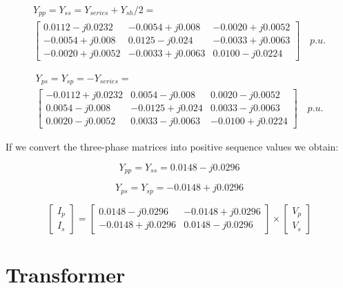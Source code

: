 \documentclass[nols,a4paper,twoside,notoc,fleqn]{tufte-book}
\begin{document}
\begin{equation}
	\begin{split}
		Y_{pp} = Y_{ss} = Y_{series} + Y_{sh}/2 = \\
		 \left[ \begin{array}{ccc}
		0.0112-j0.0232  & -0.0054+j0.008   & -0.0020+j0.0052 \\ -0.0054+j0.008  &  0.0125-j0.024 & -0.0033+j0.0063 \\ -0.0020+j0.0052 &  -0.0033+j0.0063 & 0.0100-j0.0224
		\end{array} \right]\quad  p.u.
	\end{split}
\end{equation}

\begin{equation}
	\begin{split}
		Y_{ps} = Y_{sp} = -Y_{series} = \\ \left[ \begin{array}{ccc}
		-0.0112+j0.0232  & 0.0054-j0.008   & 0.0020-j0.0052 \\  0.0054-j0.008  &  -0.0125+j0.024 & 0.0033-j0.0063 \\  0.0020-j0.0052 &  0.0033-j0.0063 & -0.0100+j0.0224
		\end{array} \right]\quad  p.u.
	\end{split}
\end{equation}

If we convert the three-phase matrices into positive sequence values we obtain:

$$
Y_{pp} = Y_{ss} = 0.0148 -j0.0296
$$

$$
Y_{ps} = Y_{sp} = -0.0148 +j0.0296
$$


$$
\left[\begin{array}{c}
I_p \\
I_s
\end{array}\right] = \left[\begin{array}{cc}
0.0148 -j0.0296 & -0.0148 +j0.0296\\
-0.0148 +j0.0296 & 0.0148 -j0.0296
\end{array}\right] \times \left[\begin{array}{c}
V_p \\
V_s
\end{array}\right]
$$



\newpage
\section{Transformer}
\end{document}
